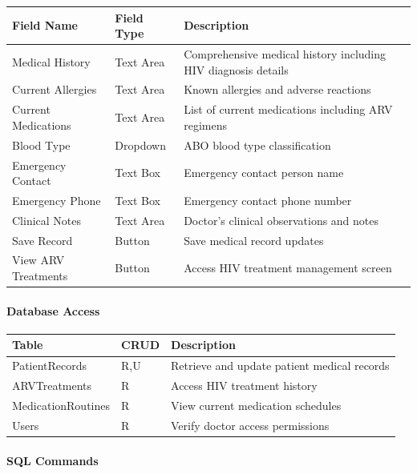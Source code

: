 \documentclass[12pt,a4paper]{article}
\begin{document}
\begin{longtable}{|p{3cm}|p{3cm}|p{8cm}|}
\hline
\textbf{Field Name} & \textbf{Field Type} & \textbf{Description} \\
\hline
Medical History & Text Area & Comprehensive medical history including HIV diagnosis details \\
\hline
Current Allergies & Text Area & Known allergies and adverse reactions \\
\hline
Current Medications & Text Area & List of current medications including ARV regimens \\
\hline
Blood Type & Dropdown & ABO blood type classification \\
\hline
Emergency Contact & Text Box & Emergency contact person name \\
\hline
Emergency Phone & Text Box & Emergency contact phone number \\
\hline
Clinical Notes & Text Area & Doctor's clinical observations and notes \\
\hline
Save Record & Button & Save medical record updates \\
\hline
View ARV Treatments & Button & Access HIV treatment management screen \\
\hline
\end{longtable}

\paragraph{Database Access}

\begin{longtable}{|p{3cm}|p{2cm}|p{9cm}|}
\hline
\textbf{Table} & \textbf{CRUD} & \textbf{Description} \\
\hline
PatientRecords & R,U & Retrieve and update patient medical records \\
\hline
ARVTreatments & R & Access HIV treatment history \\
\hline
MedicationRoutines & R & View current medication schedules \\
\hline
Users & R & Verify doctor access permissions \\
\hline
\end{longtable}

\paragraph{SQL Commands}
\end{document}
